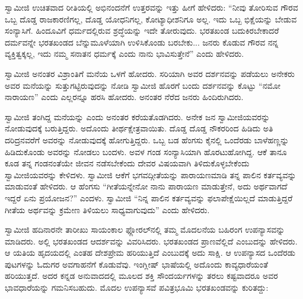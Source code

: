 \vskip 2pt

 ಸ್ವಾಮೀಜಿ ಉಚಿತವಾದ ರೀತಿಯಲ್ಲಿ ಅಭಿನಂದನೆಗೆ ಉತ್ತರವನ್ನು ಇತ್ತು ಹೀಗೆ ಹೇಳಿದರು: “ನೀವು ತೋರಿಸುವ ಗೌರವ ಒಬ್ಬ ದೊಡ್ಡ ರಾಜಕಾರಣಿಗಲ್ಲ, ದೊಡ್ಡ ಯೋಧನಿಗಲ್ಲ, ಕೋಟ್ಯಾಧೀಶನಿಗೂ ಅಲ್ಲ. ಇದು ಒಬ್ಬ ಭಿಕ್ಷೆಯನ್ನು ಬೇಡುವ ಸಂನ್ಯಾಸಿಗೆ. ಹಿಂದೂವಿಗೆ ಧರ್ಮದಲ್ಲಿರುವ ಶ್ರದ್ಧೆಯನ್ನು ಇದೇ ತೋರುವುದು. ಭರತಖಂಡ ಬದುಕಿರಬೇಕಾದರೆ ದರ್ಮವನ್ನೇ ಭರತಖಂಡದ ಬೆನ್ನುಮೂಳೆಯಾಗಿ ಉಳಿಸಿಕೊಂಡು ಬರಬೇಕು... ಜನರು ಕೊಡುವ ಗೌರವ ನನ್ನ ವ್ಯಕ್ತಿತ್ವಕ್ಕಲ್ಲ, ಇದು ನಮ್ಮ ಸನಾತನ ಧರ್ಮಕ್ಕೆ ಎಂದು ನಾನು ಭಾವಿಸುತ್ತೇನೆ” ಎಂದು ಹೇಳಿದರು. 

\vskip 2pt

 ಸ್ವಾಮೀಜಿ ಅನಂತರ ವಿಶ್ರಾಂತಿಗೆ ಮನೆಯ ಒಳಗೆ ಹೋದರು. ಸರಿಯಾಗಿ ಅವರ ದರ್ಶನವನ್ನು ಪಡೆಯಲು ಅನೇಕರು ಅವರ ಮನೆಯನ್ನು ಸುತ್ತುಗಟ್ಟಿರುವುದನ್ನು ನೋಡಿ ಸ್ವಾಮೀಜಿ ಹೊರಗೆ ಬಂದು ದರ್ಶನವನ್ನು ಕೊಟ್ಟು “ನಮೋ ನಾರಾಯಣ” ಎಂದು ಎಲ್ಲರನ್ನೂ ಹರಸಿ ಹೋದರು. ಅನಂತರ ನೆರೆದ ಜನರು ಹಿಂದಿರುಗಿದರು. 

\vskip 2pt

 ಸ್ವಾಮೀಜಿ ತಂಗಿದ್ದ ಮನೆಯನ್ನು  ಎಂದು ಅನಂತರ ಕರೆಯತೊಡಗಿದರು. ಅನೇಕ ಜನ ಸ್ವಾಮೀಜಿಯವರನ್ನು ನೋಡುವುದಕ್ಕೆ ಬರುತ್ತಿದ್ದರು. ಅದೊಂದು ತೀರ್ಥಕ್ಷೇತ್ರವಾಯಿತು. ದೊಡ್ಡ ದೊಡ್ಡ ನೌಕರರಿಂದ ಹಿಡಿದು ಅತಿ ದರಿದ್ರನವರೆಗೆ ಅವರನ್ನು ನೋಡುವುದಕ್ಕೆ ಹೋಗುತ್ತಿದ್ದರು. ಒಬ್ಬ ಬಡ ಹೆಂಗಸು ಕೈನಲ್ಲಿ ಒಂದೆರಡು ಬಾಳೆಹಣ್ಣನ್ನು ಹಿಡಿದುಕೊಂಡು ಅವರನ್ನು ನೋಡಲು ಬಂದಳು. ಅವಳ ಗಂಡ ಸಂನ್ಯಾಸಿಯಾಗಿ ಹೊರಟುಹೋಗಿದ್ದ. ಆಕೆ ತಾನೂ ಕೂಡ ತನ್ನ ಗಂಡನಂತೆಯೇ ಜೀವನ ನಡೆಸಬೇಕೆಂದು ದೇವರ ವಿಷಯವಾಗಿ ತಿಳಿದುಕೊಳ್ಳಬೇಕೆಂದು ಸ್ವಾಮೀಜಿಯವರನ್ನು ಕೇಳಿದಳು. ಸ್ವಾಮೀಜಿ ಆಕೆಗೆ ಭಗವದ್ಗೀತೆಯನ್ನು ಪಾರಾಯಣಮಾಡಿ ತನ್ನ ಪಾಲಿನ ಕರ್ತವ್ಯವನ್ನು ಮಾಡುವಂತೆ ಹೇಳಿದರು. ಆ ಹೆಂಗಸು “ಗೀತೆಯನ್ನೇನೋ ನಾನು ಪಾರಾಯಣ ಮಾಡುತ್ತೇನೆ, ಅದು ಅರ್ಥವಾಗದೆ ಇದ್ದರೆ ಏನು ಪ್ರಯೋಜನ?” ಎಂದಳು. ಸ್ವಾಮೀಜಿ “ನಿನ್ನ ಪಾಲಿನ ಕರ್ತವ್ಯವನ್ನು ಫಲಾಪೇಕ್ಷೆಯಿಲ್ಲದೆ ಮಾಡುತ್ತಿದ್ದರೆ ಗೀತೆಯ ಅರ್ಥವನ್ನು ಕ್ರಮೇಣ ತಿಳಿಯಲು ಸಾಧ್ಯವಾಗುವುದು” ಎಂದು ಹೇಳಿದರು. 

 ಸ್ವಾಮೀಜಿ ಹದಿನಾರನೇ ತಾರೀಖು ಸಾಯಂಕಾಲ ಫ್ಲೋರಲ್‍ನಲ್ಲಿ ತಮ್ಮ ಮೊದಲನೆಯ ಬಹಿರಂಗ ಉಪನ್ಯಾಸವನ್ನು ಮಾಡಿದರು. ಅಲ್ಲಿ ಭರತಖಂಡದ ಆದರ್ಶವನ್ನು ವಿವರಿಸಿದರು. ಭರತಖಂಡದ ಪ್ರಾಣವೆಲ್ಲಿದೆ ಎಂಬುದನ್ನು ಹೇಳಿದರು. ಆ ಯತಿಯ ಹೃದಯದಲ್ಲಿ ಎಂತಹ ದೇಶಪ್ರೇಮ ಹರಿಯುತ್ತಿದೆ ಎಂಬುದಕ್ಕೆ ಅದು ಸಾಕ್ಷಿ. ಆ ಉಪನ್ಯಾಸದ ಒಂದೆರಡು ಪುಟಗಳನ್ನು ಓದುಗರ ಅವಗಾಹನೆಗೆ ಕೊಡುವೆವು. ಇಂಗ್ಲೀಷ್ ಭಾಷೆಯಲ್ಲಿ ಅದೊಂದು ಕಾವ್ಯಧಾರೆಯಂತೆ ಹರಿಯುತ್ತದೆ. ಅದರ ಕನ್ನಡ ಅನುವಾದದಲ್ಲಿ ಮೂಲದ ಶಕ್ತಿ ಸೌಂದರ್ಯಗಳನ್ನು ತರಲು ಕಷ್ಟವಾದರೂ ಅವರ ಭಾವಧಾರೆಯನ್ನು ಗಮನಿಸಬಹುದು. ಮೊದಲ ಉಪನ್ಯಾಸವೆ ಪವಿತ್ರಭೂಮಿ ಭರತಖಂಡವನ್ನು ಕುರಿತದ್ದು: 

